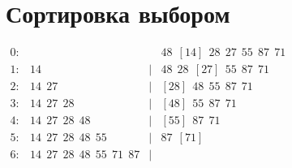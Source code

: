 \documentclass{article}
\begin{document}
\section*{Сортировка выбором}
$\begin{array}{lrcl}
        0: &                                        &   & 48 ~~ [14] ~~ 28 ~~ 27 ~~ 55 ~~ 87 ~~ 71 \\
        1: & 14                                     & | & 48 ~~ 28 ~~ [27] ~~ 55 ~~ 87 ~~ 71       \\
        2: & 14 ~~ 27                               & | & [28] ~~ 48 ~~ 55 ~~ 87 ~~ 71             \\
        3: & 14 ~~ 27 ~~ 28                         & | & [48] ~~ 55 ~~ 87 ~~ 71                   \\
        4: & 14 ~~ 27 ~~ 28 ~~ 48                   & | & [55] ~~ 87 ~~ 71                         \\
        5: & 14 ~~ 27 ~~ 28 ~~ 48 ~~ 55             & | & 87 ~~ [71]                               \\
        6: & 14 ~~ 27 ~~ 28 ~~ 48 ~~ 55 ~~ 71 ~~ 87 & | &                                          \\
    \end{array}$
\end{document}
